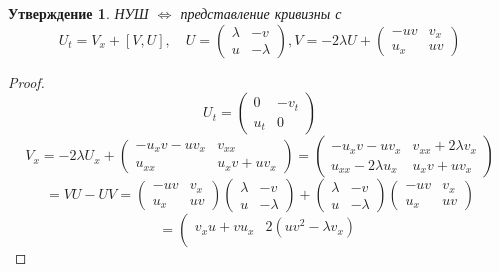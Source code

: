 \documentclass[12pt]{article}
\newtheorem{utv}{Утверждение}
\theoremstyle{definition}
\begin{document}
\begin{itemize}
\begin{utv}
НУШ $\Leftrightarrow$ представление кривизны с
\begin{equation}
    U_t=V_x+[V,U],\quad U=\left(
\begin{array}{cc}
\lambda & -v\\
u & -\lambda
\end{array}
\right), V=-2\lambda U+\left(
\begin{array}{cc}
-uv & v_x\\
u_x & uv
\end{array}
\right)
\end{equation}
\end{utv}
\begin{proof}
\begin{equation}\label{eq4}
    U_t=\left(
\begin{array}{cc}
0 & -v_t\\
u_t & 0
\end{array}
\right)
\end{equation}
\begin{equation}
    V_x=-2\lambda U_x+\left(
\begin{array}{cc}
-u_xv-uv_x & v_{xx}\\
u_{xx} & u_xv+uv_x
\end{array}
\right)=\left(
\begin{array}{cc}
-u_xv-uv_x & v_{xx}+2\lambda v_x\\
u_{xx}-2\lambda u_x & u_xv+uv_x
\end{array}
\right)
\end{equation}
\begin{equation}
    [V,U]=VU-UV=\left(
\begin{array}{cc}
-uv & v_x\\
u_x & uv
\end{array}
\right)\left(
\begin{array}{cc}
\lambda & -v\\
u & -\lambda
\end{array}
\right)+\left(
\begin{array}{cc}
\lambda & -v\\
u & -\lambda
\end{array}
\right)\left(
\begin{array}{cc}
-uv & v_x\\
u_x & uv
\end{array}
\right)
\end{equation}
\begin{equation}
   [V,U]=\left(
\begin{array}{cc}
v_xu+vu_x & 2(uv^2-\lambda v_x)\\

\end{array}
\end{equation}
\end{proof}
\end{itemize}
\end{document}
